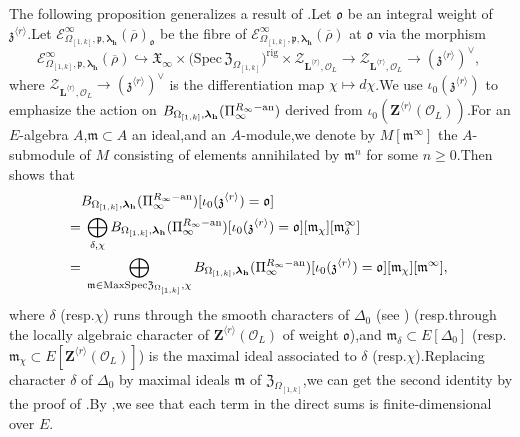 \documentclass[SecEq,CM,GP]{degruyter-crelle} %
\theoremstyle{plain}
\newcommand{\ana}{{\rm an}}
\newcommand{\bersteineigenvarpik}{{\mathcal{E}_{\omepik,\fp,\bm{\lambda}_\bh}^\infty(\overline{\rho})}}
\newcommand{\lrr}{{\langle r\rangle}}
\newcommand{\MSpec}{{\rm MaxSpec}}
\newcommand{\omepik}{\Omega_{[1,k]}}
\newcommand{\rigch}{{\mathcal{Z}_{\bL^{\lrr},\mathcal{O}_L}}}
\newcommand{\sbanpik}{{\big(\mathrm{Spec}\hspace{2pt}\mathfrak{Z}_{\omepik}\big)^{\mathrm{rig}}}}
\newcommand{\bL}{{\mathbf{L}}}
\newcommand{\bZ}{{\mathbf{Z}}}
\newcommand{\bh}{{\mathbf{h}}}
\newcommand{\cM}{\mathcal M}
\newcommand{\cO}{\mathcal O}
\newcommand{\FX}{{\mathfrak{X}}}
\newcommand{\fm}{{\mathfrak{m}}}
\newcommand{\fo}{{\mathfrak{o}}}
\newcommand{\fp}{{\mathfrak{p}}}
\newcommand{\fz}{{\mathfrak{z}}}
\begin{document}
The following proposition generalizes a result of \cite[Proposition 4.1]{breuil2007first}.\;Let $\fo$ be an integral weight of $\fz^{\lrr}$.\;Let $\mathcal{E}_{\omepik,\fp,{\bm\lambda}_\bh}^\infty(\overline{\rho})_{\fo}$ be the fibre of $\bersteineigenvarpik$  at $\fo$ via the morphism 
\[\bersteineigenvarpik\hookrightarrow \FX_{\infty}\times \sbanpik\times \rigch\rightarrow \rigch\rightarrow (\fz^{\lrr})^\vee,\;\]where $\rigch\rightarrow (\fz^{\lrr})^\vee$ is the differentiation map $\chi\mapsto d\chi$.\;We use $\iota_0(\fz^{\lrr})$  to emphasize the action on $B_{\omepik,{\bm\lambda}_\bh}(\Pi_\infty^{R_\infty-\ana})$ derived from $\iota_0(\bZ^{\lrr}(\cO_L))$.\;For an $E$-algebra $A$,\;$\fm\subset A$ an ideal,\;and an $A$-module,\;we denote by $M[\fm^{\infty}]$ the $A$-submodule of $M$ consisting of elements annihilated by $\fm^n$ for some $n\geq 0$.\;Then \cite[Lemma 3.1.4]{Ding2021} shows that 
\begin{equation}
\begin{aligned}
	&B_{\omepik,{\bm\lambda}_\bh}(\Pi_\infty^{R_\infty-\ana})[\iota_0(\fz^{\lrr})=\fo]\\
	=&\;\bigoplus_{\delta,\chi}B_{\omepik,{\bm\lambda}_\bh}(\Pi_\infty^{R_\infty-\ana})[\iota_0(\fz^{\lrr})=\fo][\fm_\chi][\fm_\delta^\infty]\\
	=&\;\bigoplus_{\fm\in \MSpec\mathfrak{Z}_{\omepik},\chi}B_{\omepik,{\bm\lambda}_\bh}(\Pi_\infty^{R_\infty-\ana})[\iota_0(\fz^{\lrr})=\fo][\fm_\chi][\fm^\infty],\;
\end{aligned}
\end{equation}
where $\delta$ (resp.\;$\chi$) runs through the smooth characters of $\Delta_0$ (see \cite[(3.4)]{Ding2021}) (resp.\;through the locally algebraic character of $\bZ^{\lrr}(\cO_L)$ of weight $\fo$),\;and $\fm_\delta\subset E[\Delta_0]$ (resp.\;$\fm_\chi\subset  E[\bZ^{\lrr}(\cO_L)]$) is the maximal ideal associated to $\delta$ (resp.\;$\chi$).\;Replacing character $\delta$ of $\Delta_0$ by maximal ideals $\fm$ of $\mathfrak{Z}_{\omepik}$,\;we can get the second identity by the proof of \cite[Lemma 3.1.4]{Ding2021}.\;By \cite[Lemma 3.1.4]{Ding2021},\;we see that each term in the direct sums is finite-dimensional over $E$.\;
\end{document}

